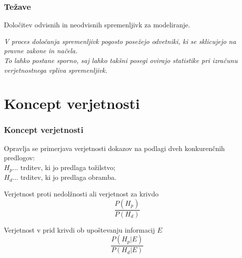 \documentclass{beamer}
\begin{document}
\begin{frame}
   \frametitle{Težave}
   \begin{block}{}
       \centering
       Določitev odvisnih in neodvisnih spremenljivk za modeliranje.
   \end{block}\vspace{3mm}
   \textit{
   V proces določanja spremenljivk pogosto posežejo odvetniki, ki se sklicujejo na pravne zakone in načela. \\ \vspace{2mm}
   To lahko postane sporno, saj lahko takšni posegi ovirajo statistike pri izračunu verjetnostnega vpliva spremenljivk.}
\end{frame}

\section{Koncept verjetnosti}

\begin{frame}
    \frametitle{Koncept verjetnosti}
    Opravlja se primerjava verjetnosti dokazov na podlagi dveh konkurenčnih predlogov:\\
    $H_p \dots$ trditev, ki jo predlaga tožilstvo;\\
    $H_d \dots$ trditev, ki jo predlaga obramba.\\ \vspace{5mm}
   \begin{beamerboxesrounded}[]{Verjetnost proti nedolžnosti ali verjetnost za krivdo}
      \[
          \frac{P(H_p)}{P(H_d)}
      \]    
  \end{beamerboxesrounded} \vspace{3mm}
  \begin{beamerboxesrounded}[]{Verjetnost v prid krivdi ob upoštevanju informacij $E$}
      \[
          \frac{P(H_p \lvert E)}{P(H_d \lvert E)} 
      \]    
  \end{beamerboxesrounded} \vspace{5mm}
\end{frame}
\end{document}
